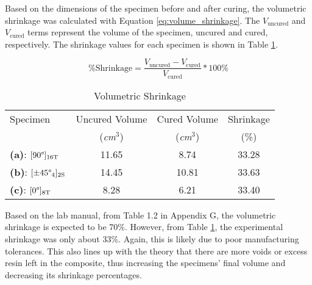 
Based on the dimensions of the specimen before and after curing, the volumetric shrinkage was calculated with Equation \ref{eq:volume_shrinkage}. The $V_\text{uncured}$ and $V_\text{cured}$ terms represent the volume of the specimen, uncured and cured, respectively. The shrinkage values for each specimen is shown in Table \ref{tab:volume_shrinkage_tab}. 

\begin{equation} \label{eq:volume_shrinkage}
    \% \text{Shrinkage} = \frac{V_\text{uncured} - V_\text{cured}}{V_\text{cured}} * 100 \%
\end{equation}


\begin{table}[!h]
    \centering
    \caption{Volumetric Shrinkage}
    \begin{tabular}{|l||c|c|c|}\toprule
        Specimen & Uncured Volume & Cured Volume & Shrinkage \\ 
        & (\textit{cm$^{3}$}) & (\textit{cm$^{3}$}) & (\%) \\ \midrule
        \textbf{(a)}: $[90\degree]_{16\text{T}}$ & 11.65 & 8.74 & 33.28 \\\hline
        \textbf{(b)}: $[\pm45\degree_4]_{2\text{S}}$ & 14.45 & 10.81 & 33.63 \\\hline
        \textbf{(c)}: $[0\degree]_{8\text{T}}$ & 8.28 & 6.21 & 33.40 \\\bottomrule
    \end{tabular}
    \label{tab:volume_shrinkage_tab}
\end{table}

Based on the lab manual, from Table 1.2 in Appendix G, the volumetric shrinkage is expected to be 70\%. However, from Table \ref{tab:volume_shrinkage_tab}, the experimental shrinkage was only about 33\%. Again, this is likely due to poor manufacturing tolerances. This also lines up with the theory that there are more voids or excess resin left in the composite, thus increasing the specimens' final volume and decreasing its shrinkage percentages.